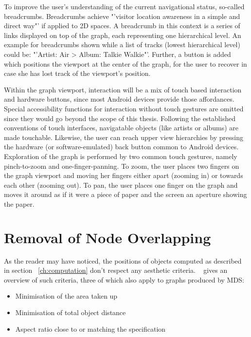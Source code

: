 To improve the user's understanding of the current navigational status, so-called breadcrumbs. Breadcrumbs achieve "'visitor location awareness in a simple and direct way"' \cite{Tesoriero:2008:Breadcrumbs} if applied to 2D spaces. A breadcrumb in this context is a series of links displayed on top of the graph, each representing one hierarchical level. An example for breadcrumbs shown while a list of tracks (lowest hierarchical level) could be: "'Artist: Air > Album: Talkie Walkie"'. Further, a button is added which positions the viewport at the center of the graph, for the user to recover in case she has lost track of the viewport's position.

Within the graph viewport, interaction will be a mix of touch based interaction and hardware buttons, since most Android devices provide those affordances. Special accessibility functions for interaction without touch gestures are omitted since they would go beyond the scope of this thesis.
Following the established conventions of touch interfaces, navigatable objects (like artists or albums) are made touchable. Likewise, the user can reach upper view hierarchies by pressing the hardware (or software-emulated) back button common to Android devices.
Exploration of the graph is performed by two common touch gestures, namely pinch-to-zoom and one-finger-panning. To zoom, the user places two fingers on the graph viewport and moving her fingers either apart (zooming in) or towards each other (zooming out). To pan, the user places one finger on the graph and moves it around as if it were a piece of paper and the screen an aperture showing the paper.

\section{Removal of Node Overlapping}

As the reader may have noticed, the positions of objects computed as described in section ~\ref{ch:computation} don't respect any aesthetic criteria. ~\cite{Li:2005} gives an overview of such criteria, three of which also apply to graphs produced by MDS:

\begin{itemize}
	\item Minimisation of the area taken up
	\item Minimisation of total object distance
	\item Aspect ratio close to or matching the specification
\end{itemize}

